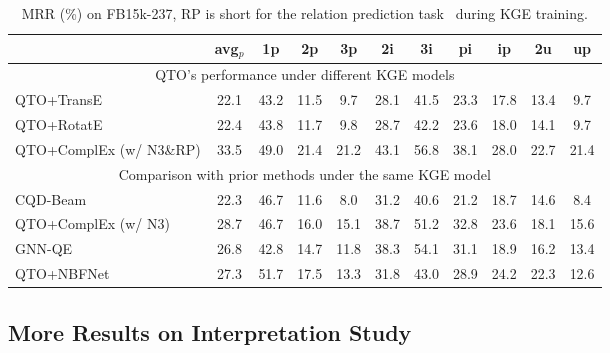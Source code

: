 \begin{table}[t]
    \centering
    \begin{tabular}{lcccccccccc}
        \toprule
        & {\bf avg$_p$} & {\bf 1p} & {\bf 2p} & {\bf 3p} & {\bf 2i} & {\bf 3i} & {\bf pi} & {\bf ip} & {\bf 2u} & {\bf up} \\
        \midrule
        \multicolumn{11}{c}{QTO's performance under different KGE models} \\
        \midrule
        QTO+TransE & 22.1 & 43.2 & 11.5 & 9.7 & 28.1 & 41.5 & 23.3 & 17.8 & 13.4 & 9.7 \\
        QTO+RotatE & 22.4 & 43.8 & 11.7 & 9.8 & 28.7 & 42.2 & 23.6 & 18.0 & 14.1 & 9.7 \\
        QTO+ComplEx (w/ N3\&RP) & 33.5 & 49.0 & 21.4 & 21.2 & 43.1 & 56.8 & 38.1 & 28.0 & 22.7 & 21.4 \\
        \midrule
        \multicolumn{11}{c}{Comparison with prior methods under the same KGE model} \\
        \midrule
        CQD-Beam & 22.3 & 46.7 & 11.6 & 8.0 & 31.2 & 40.6 & 21.2 & 18.7 & 14.6 & 8.4 \\
        QTO+ComplEx (w/ N3) & 28.7 & 46.7 & 16.0 & 15.1 & 38.7 & 51.2 & 32.8 & 23.6 & 18.1 & 15.6 \\
        GNN-QE & 26.8 & 42.8 & 14.7 & 11.8 & 38.3 & 54.1 & 31.1 & 18.9 & 16.2 & 13.4 \\
        QTO+NBFNet & 27.3 & 51.7 & 17.5 & 13.3 & 31.8 & 43.0 & 28.9 & 24.2 & 22.3 & 12.6 \\
        \bottomrule
    \end{tabular}
    \caption{MRR (\%) on FB15k-237, RP is short for the relation prediction task~\cite{chen2021relation} during KGE training.}
    \label{tb:kge}
\end{table}

\subsection{More Results on Interpretation Study}
\label{app:inter}

